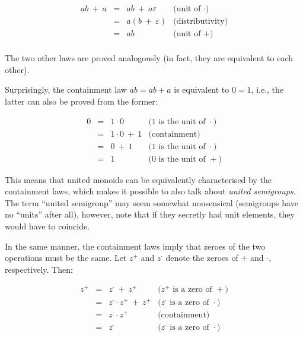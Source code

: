 \documentclass[english,submission]{programming}
\begin{document}
\vspace{-5mm}
\begin{equation*}
\begin{array}{rcll}
\textit{ab}\ +\ a & = & \textit{ab}\ +\ a\varepsilon & \text{(unit of $\cdot$)}\\
 & = & a(b\ +\ \varepsilon) & \text{(distributivity)}\\
 & = & \textit{ab} & \text{(unit of $+$)}\\
\end{array}
\end{equation*}
\vspace{-3mm}

\noindent
The two other laws are proved analogously (in fact, they are equivalent to each
other).

Surprisingly, the containment law $\textit{ab} = \textit{ab} + a$ is equivalent
to $0 = 1$, i.e., the latter can also be proved from the former:

\vspace{-5mm}
\begin{equation*}
\begin{array}{rcll}
0 & = & 1\cdot0 & \text{($1$ is the unit of $\cdot$)}\\
 & = & 1\cdot0\ +\ 1 & \text{(containment)}\\
 & = & 0\ +\ 1 & \text{($1$ is the unit of $\cdot$)}\\
 & = & 1 & \text{($0$ is the unit of $+$)}
\end{array}
\end{equation*}
\vspace{-3mm}

\noindent
This means that united monoids can be equivalently characterised by the
containment laws, which makes it possible to also talk about
\emph{united semigroups}. The term ``united semigroup'' may seem somewhat
nonsensical (semigroups have no ``units'' after all), however, note that if they
secretly had unit elements, they would have to coincide.

In the same manner, the containment laws imply that zeroes of the two operations
must be the same. Let $z^{+}$ and $z^{\cdot}$ denote the zeroes of $+$ and
$\cdot$, respectively. Then:

\vspace{-5mm}
\begin{equation*}
\begin{array}{rcll}
z^{+} & = & z^{\cdot}\ +\ z^{+} & \text{($z^{+}$ is a zero of $+$)}\\
 & = & z^{\cdot} \cdot z^{+}\ +\ z^{+} & \text{($z^{\cdot}$ is a zero of $\cdot$)}\\
 & = & z^{\cdot} \cdot z^{+} & \text{(containment)}\\
 & = & z^{\cdot} & \text{($z^{\cdot}$ is a zero of $\cdot$)}
\end{array}
\end{equation*}
\vspace{-3mm}
\end{document}
